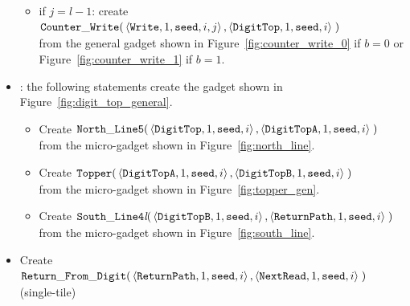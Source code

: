 \begin{itemize}
\begin{itemize}
        \item if $j = l-1$: create
        $\begin{aligned}[t]
            {\tt Counter\_Write}(&\left\langle {\tt Write}, 1, {\tt seed}, i, j \right\rangle, \left\langle {\tt DigitTop}, 1, {\tt seed}, i \right\rangle \;)
        \end{aligned}$\\from the general gadget shown in Figure~\ref{fig:counter_write_0} if $b = 0$ or Figure~\ref{fig:counter_write_1} if $b = 1$.
    \end{itemize}


    \item {\dtop}: the following statements create the gadget shown in Figure~\ref{fig:digit_top_general}.
    \begin{itemize}
        \item Create
        $\begin{aligned}[t]
            {\tt North\_Line5}(& \left \langle {\tt DigitTop},  1, {\tt seed}, i \right\rangle,
                                 \left \langle {\tt DigitTopA}, 1, {\tt seed}, i \right\rangle \;)
        \end{aligned}$\\ from the micro-gadget shown in Figure~\ref{fig:north_line}.

        \item Create
        $\begin{aligned}[t]
            {\tt Topper}(& \left\langle {\tt DigitTopA}, 1, {\tt seed}, i \right\rangle,
                           \left\langle {\tt DigitTopB}, 1, {\tt seed}, i \right\rangle \;)
        \end{aligned}$\\ from the micro-gadget shown in Figure~\ref{fig:topper_gen}.

        \item Create
        $\begin{aligned}[t]
            {\tt South\_Line4\textit{l}}(& \left\langle {\tt DigitTopB}, 1, {\tt seed}, i\right\rangle,
                                           \left\langle {\tt ReturnPath},     1, {\tt seed}, i\right\rangle \;)
        \end{aligned}$\\ from the micro-gadget shown in Figure~\ref{fig:south_line}.
    \end{itemize}

    \item Create
    $\begin{aligned}[t]
            {\tt Return\_From\_Digit}(&\left\langle {\tt ReturnPath},    1, {\tt seed}, i \right\rangle,
                              \left\langle {\tt NextRead}, 1, {\tt seed}, i \right\rangle \;)
    \end{aligned}$\\ (single-tile)


\end{itemize}
